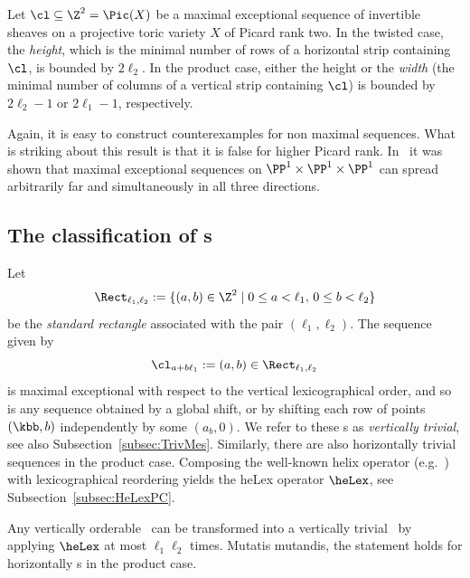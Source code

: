   \begin{main}  \label{thm:introB}
Let $\cl\subseteq\Z^2=\Pic(X)$ be a 
maximal exceptional sequence of invertible 
sheaves on a projective toric variety $X$ 
of Picard rank two. In the twisted case, 
the {\em height}, which is the minimal number of rows 
of a horizontal strip containing $\cl$, is bounded by 
$2\ell_2$. In the product case, either the height or 
the {\em width} (the minimal number of columns of a 
vertical strip containing $\cl$) is bounded by $2\ell_2-1$ 
or $2\ell_1-1$, respectively.
 \end{main}

Again, it is easy to construct counterexamples 
for non maximal sequences. What is striking 
about this result is that it is false for higher 
Picard rank. In~\cite[Example~3.4]{p1p1p1} 
it was shown that maximal exceptional sequences 
on $\PP^1\times\PP^1\times\PP^1$ can spread 
arbitrarily far and simultaneously in all 
three directions.

\subsection{The classification of {\mes}s}
\label{subsubsec:HeLexing}
{Let
$$
\Rect_{\ell_1,\ell_2}:=\{(a,b)\in\Z^2\mid 
0\leq a<\ell_1,\,0\leq b<\ell_2\}
$$
be the {\em standard rectangle} associated 
with the pair $(\ell_1,\ell_2)$. 
The sequence given by
$$
\cl_{a+b\ell_1}:=(a,b)\in\Rect_{\ell_1,\ell_2}
$$
is maximal exceptional with respect to the vertical 
lexicographical order, and so is any sequence obtained 
by a global shift, or by shifting 
{each row of points $(\kbb,b)$ independently by some $(a_b,0)$.}
We refer to these \mes s as 
{\em vertically trivial}, see also 
Subsection~\ref{subsec:TrivMes}. Similarly, 
there are also horizontally trivial sequences in the 
product case. Composing the well-known helix operator 
(e.g.~\cite{rudakov}) with lexicographical reordering 
yields the heLex operator {$\heLex$}, see 
Subsection~\ref{subsec:HeLexPC}.}

\begin{main}  \label{thm:introC}
Any vertically orderable \mes\ can be transformed 
into a vertically trivial \mes\ by applying $\heLex$ 
at most $\ell_1\ell_2$ times. Mutatis mutandis, the 
statement holds for horizontally \mes s in the 
product case.
 \end{main}

